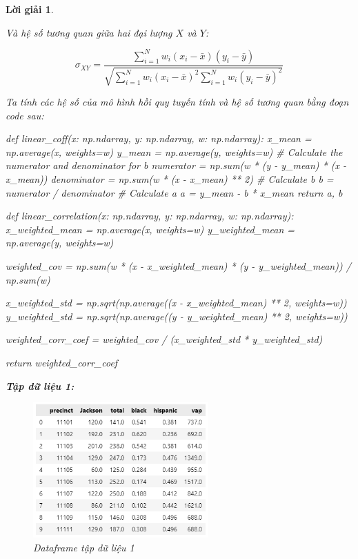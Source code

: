\documentclass[14pt, a4paper]{article}
\theoremstyle{sltheorem}
\theoremstyle{soltheorem}
\newtheorem*{loigiai}{Lời giải}
\begin{document}
\begin{loigiai}
\begin{enumerate}
        Và hệ số tương quan giữa hai đại lượng $X$ và $Y$:

        \begin{equation*}
            \sigma_{XY} = \dfrac{\sum_{i=1}^N w_i (x_i - \bar{x})(y_i - \bar{y})}{\sqrt{\sum_{i=1}^N w_i (x_i - \bar{x})^2 \sum_{i=1}^N w_i (y_i - \bar{y})^2}}
        \end{equation*}

        Ta tính các hệ số của mô hình hồi quy tuyến tính và hệ số tương quan bằng đoạn code sau:

        \begin{python}
def linear_coff(x: np.ndarray, y: np.ndarray, w: np.ndarray):
    x_mean = np.average(x, weights=w)
    y_mean = np.average(y, weights=w)
    # Calculate the numerator and denominator for b
    numerator = np.sum(w * (y - y_mean) * (x - x_mean))
    denominator = np.sum(w * (x - x_mean) ** 2)
    # Calculate b
    b = numerator / denominator
    # Calculate a
    a = y_mean - b * x_mean
    return a, b
        \end{python}


\begin{python}
def linear_correlation(x: np.ndarray, y: np.ndarray, w: np.ndarray):
    x_weighted_mean = np.average(x, weights=w)
    y_weighted_mean = np.average(y, weights=w)
    
    weighted_cov = np.sum(w * (x - x_weighted_mean) * (y - y_weighted_mean)) / np.sum(w)
    
    x_weighted_std = np.sqrt(np.average((x - x_weighted_mean) ** 2, weights=w))
    y_weighted_std = np.sqrt(np.average((y - y_weighted_mean) ** 2, weights=w))
    
    weighted_corr_coef = weighted_cov / (x_weighted_std * y_weighted_std)
    
    return weighted_corr_coef
\end{python}

    \textbf{Tập dữ liệu 1:}

    \begin{figure}[H]
        \centering
        \includegraphics[width=0.6\textwidth]{figures/primary_df.png}
        \caption{Dataframe tập dữ liệu 1}
        \label{fig:primary_df}
    \end{figure}


\end{enumerate}
\end{loigiai}
\end{document}

